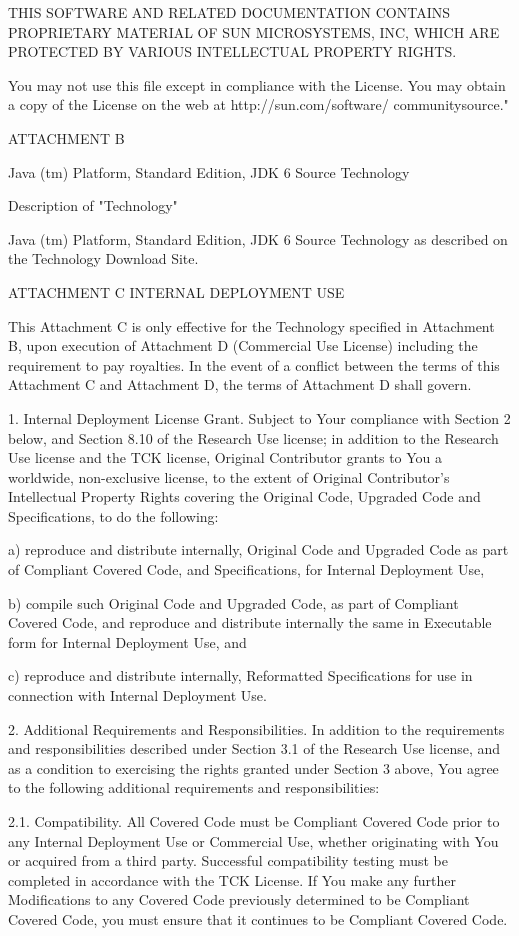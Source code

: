 {THIS SOFTWARE AND RELATED DOCUMENTATION CONTAINS PROPRIETARY MATERIAL
OF SUN MICROSYSTEMS, INC, WHICH ARE PROTECTED BY VARIOUS INTELLECTUAL
PROPERTY RIGHTS.

You may not use this file except in compliance with the License.  You
may obtain a copy of the License on the web at
http://sun.com/software/ communitysource."

ATTACHMENT B

Java (tm) Platform, Standard Edition, JDK 6 Source Technology

Description of "Technology"

Java (tm) Platform, Standard Edition, JDK 6 Source Technology as
described on the Technology Download Site.

ATTACHMENT C INTERNAL DEPLOYMENT USE

This Attachment C is only effective for the Technology specified in
Attachment B, upon execution of Attachment D (Commercial Use License)
including the requirement to pay royalties.  In the event of a
conflict between the terms of this Attachment C and Attachment D, the
terms of Attachment D shall govern.

1.  Internal Deployment License Grant.  Subject to Your compliance
with Section 2 below, and Section 8.10 of the Research Use license; in
addition to the Research Use license and the TCK license, Original
Contributor grants to You a worldwide, non-exclusive license, to the
extent of Original Contributor's Intellectual Property Rights covering
the Original Code, Upgraded Code and Specifications, to do the
following:

a) reproduce and distribute internally, Original Code and Upgraded
Code as part of Compliant Covered Code, and Specifications, for
Internal Deployment Use,

b) compile such Original Code and Upgraded Code, as part of Compliant
Covered Code, and reproduce and distribute internally the same in
Executable form for Internal Deployment Use, and

c) reproduce and distribute internally, Reformatted Specifications for
use in connection with Internal Deployment Use.

2.  Additional Requirements and Responsibilities.  In addition to the
requirements and responsibilities described under Section 3.1 of the
Research Use license, and as a condition to exercising the rights
granted under Section 3 above, You agree to the following additional
requirements and responsibilities:

2.1.  Compatibility.  All Covered Code must be Compliant Covered Code
prior to any Internal Deployment Use or Commercial Use, whether
originating with You or acquired from a third party.  Successful
compatibility testing must be completed in accordance with the TCK
License.  If You make any further Modifications to any Covered Code
previously determined to be Compliant Covered Code, you must ensure
that it continues to be Compliant Covered Code.

}
